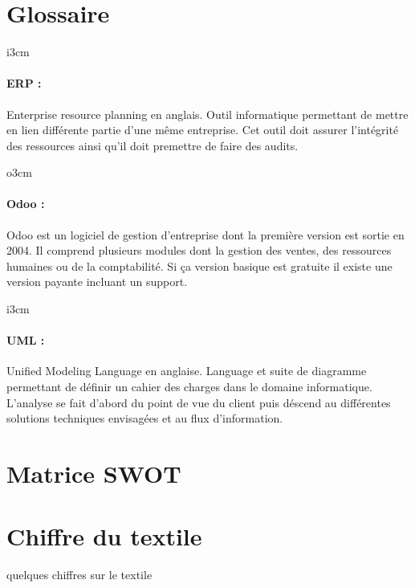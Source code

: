 \renewcommand{\contentsname}{Table des annexes}
\tableofcontents
\clearpage
\section{Glossaire}

\begin{wrapfigure}[5]{i}{3cm}
\end{wrapfigure}

\paragraph{ERP : }

Enterprise resource planning  en anglais. Outil informatique permettant de mettre en lien différente partie d'une même entreprise. Cet outil doit assurer l'intégrité des ressources ainsi qu'il doit premettre de faire des audits.

\begin{wrapfigure}[5]{o}{3cm}
\end{wrapfigure}
\paragraph{Odoo : }

Odoo est un logiciel de gestion d'entreprise dont la première version est sortie en 2004. Il comprend plusieurs modules dont la gestion des ventes, des ressources humaines ou de la comptabilité. Si ça version basique est gratuite il existe une version payante incluant un support.

\begin{wrapfigure}[5]{i}{3cm}
\end{wrapfigure}
\paragraph{UML : }

Unified Modeling Language en anglaise. Language et suite de diagramme permettant de définir un cahier des charges dans le domaine informatique. L'analyse se fait d'abord du point de vue du client puis déscend au différentes solutions techniques envisagées et au flux d'information.
\clearpage
\section{Matrice SWOT}

\clearpage
\section{Chiffre du textile}
quelques chiffres sur le textile
